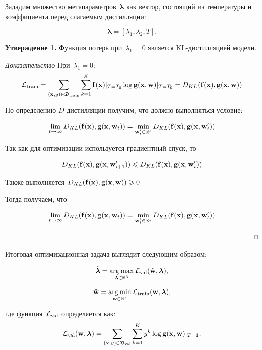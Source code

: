 \documentclass[12pt, twoside]{article}
\begin{document}
Зададим множество метапараметров~$\boldsymbol{\lambda}$ как вектор, состоящий из температуры и коэффициента перед слагаемым дистилляции:

\[\boldsymbol{\lambda} = [\lambda_1, \lambda_2, T].\]

\textbf{Утверждение 1.}
Функция потерь при~$\lambda_1 = 0$ является KL-дистилляцией модели.

\textit{Доказательство}
При~$\lambda_1 = 0$:
$$\mathcal{L}_\text{train} = \sum\limits_{(\mathbf{x}, y) \in \mathfrak{D}_\text{train}}\sum\limits_{k=1}^{K}\mathbf{f}(\mathbf{x})|_{T=T_0}\log \mathbf{g}(\mathbf{x}, \mathbf{w})|_{T=T_0} = D_{KL}(\mathbf{f}(\mathbf{x}), \mathbf{g}(\mathbf{x}, \mathbf{w}))$$

По определению $D$-дистилляции получим, что должно выполняться условие:

$$\lim_{t \to \infty} D_{KL}(\bff(\bx), \bg(\bx, \bw_t))=\min_{\bw^\prime_t \in \bbR^s} D_{KL}(\bff(\bx), \bg(\bx, \bw^\prime_t))$$

Так как для оптимизации используется градиентный спуск, то

$$D_{KL}(\mathbf{f}(\mathbf{x}), \mathbf{g}(\mathbf{x}, \mathbf{w}^\prime_{i+1})) \leqslant D_{KL}(\mathbf{f}(\mathbf{x}), \mathbf{g}(\mathbf{x}, \mathbf{w}^\prime_i))$$

Также выполняется $D_{KL}(\mathbf{f}(\mathbf{x}), \mathbf{g}(\mathbf{x}, \mathbf{w})) \geqslant 0$

Тогда получаем, что

$$\lim_{t \to \infty} D_{KL}(\bff(\bx), \bg(\bx, \bw_t))=\min_{\bw^\prime_t \in \bbR^s} D_{KL}(\bff(\bx), \bg(\bx, \bw^\prime_t))$$

\begin{equation*}
    \hspace{16.3 cm}\Box
\end{equation*}

Итоговая оптимизационная задача выглядит следующим образом:

\begin{equation} \label{eq:opt_hyp}
    \hat{\boldsymbol{\lambda}} = \argmax\limits_{\boldsymbol{\lambda} \in \bbR^3} \cL_\text{val}(\hat{\bw}, \boldsymbol{\lambda}),
\end{equation}

\begin{equation} \label{eq:opt_param}
    \hat{\bw} = \argmin\limits_{\bw \in \bbR^s} \cL_\text{train}(\bw, \boldsymbol{\lambda}),
\end{equation}

\noindent
где функция~$\mathcal{L}_\text{val}$ определяется как: 
 \begin{equation} \label{eq:l_val}
     \cL_\text{val}(\bw, \boldsymbol{\lambda}) = \sum\limits_{(\bx, y) \in \fD_\text{val}}\sum\limits_{k=1}^{K}y^k\log \bg(\bx, \bw)|_{T=1}.
 \end{equation}
\end{document}
